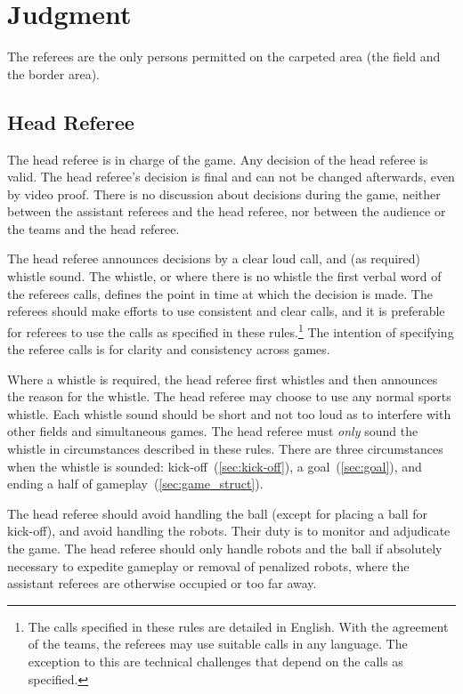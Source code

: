 \section{Judgment}
\label{sec:judgment}

The referees are the only persons permitted on the carpeted area (\ie the field and the border area).

\subsection{Head Referee}
\label{sec:head_referee}

The head referee is in charge of the game.
Any decision of the head referee is valid.
The head referee's decision is final and can not be changed afterwards, even by video proof.
There is no discussion about decisions during the game, neither between the assistant referees and the head referee, nor between the audience or the teams and the head referee.

The head referee announces decisions by a clear loud call, and (as required) whistle sound.
The whistle, or where there is no whistle the first verbal word of the referees calls, defines the point in time at which the decision is made.
The referees should make efforts to use consistent and clear calls, and it is preferable for referees to use the calls as specified in these rules.\footnote{
  The calls specified in these rules are detailed in English.
  With the agreement of the teams, the referees may use suitable calls in any language.
  The exception to this are technical challenges that depend on the calls as specified.
}
The intention of specifying the referee calls is for clarity and consistency across games.

Where a whistle is required, the head referee first whistles and then announces the reason for the whistle.
The head referee may choose to use any normal sports whistle.
Each whistle sound should be short and not too loud as to interfere with other fields and simultaneous games.
The head referee must \textit{only} sound the whistle in circumstances described in these rules.
There are three circumstances when the whistle is sounded: kick-off~(\cf \cref{sec:kick-off}), a goal~(\cf \cref{sec:goal}), and ending a half of gameplay~(\cf \cref{sec:game_struct}).

The head referee should avoid handling the ball (except for placing a ball for kick-off), and avoid handling the robots.
Their duty is to monitor and adjudicate the game.
The head referee should only handle robots and the ball if absolutely necessary to expedite gameplay or removal of penalized robots, where the assistant referees are otherwise occupied or too far away.

